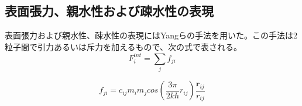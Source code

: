 \documentclass[]{jsarticle}
\begin{document}
\subsection{表面張力、親水性および疎水性の表現}
表面張力および親水性、疎水性の表現にはYangらの手法を用いた。この手法は2粒子間で引力あるいは斥力を加えるもので、次の式で表される。
\begin{equation}
F^{int}_i=\sum_{j} f_{ji}
\end{equation}


\begin{equation}
f_{ji}=c_{ij}m_im_jcos(\frac{3\pi}{2kh}r_{ij})\frac{\bm{r}_{ij}}{r_{ij}}
\end{equation}
\end{document}
